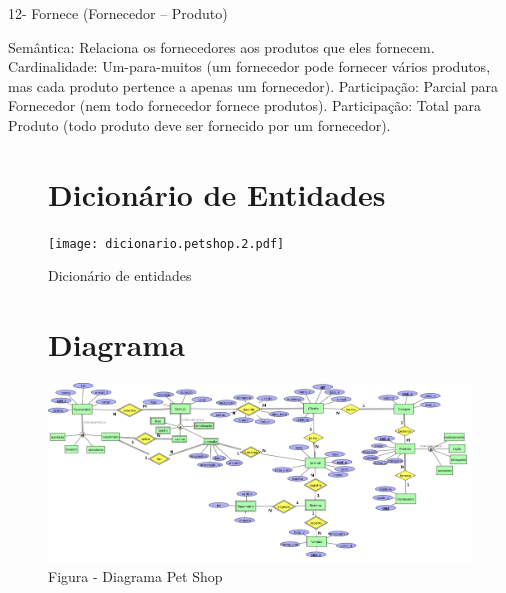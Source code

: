 \documentclass{article}
\begin{document}
12- Fornece (Fornecedor – Produto) 

Semântica: Relaciona os fornecedores aos produtos que eles fornecem. 
Cardinalidade: Um-para-muitos (um fornecedor pode fornecer vários produtos, mas cada produto pertence a apenas um fornecedor). 
Participação: Parcial para Fornecedor (nem todo fornecedor fornece produtos). 
Participação: Total para Produto (todo produto deve ser fornecido por um fornecedor). 


\begin{figure}

\section{Dicionário de Entidades}

    \centering
    \texttt{[image: dicionario.petshop.2.pdf]}
    \caption{Dicionário de entidades}
    \label{fig:placeholder}
\end{figure}

\begin{figure}
\section{Diagrama}
    \centering
    \includegraphics[width=1\linewidth]{diagrama.petshop.png}
    \caption{Figura - Diagrama Pet Shop}
    \label{fig:placeholder}
\end{figure}
\end{document}
